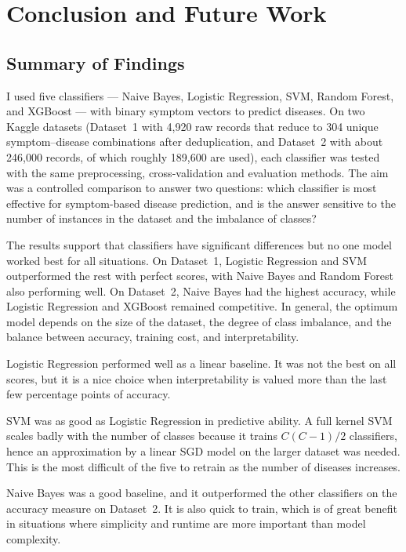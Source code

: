 \chapter{Conclusion and Future Work}
\label{ch:conclusion}

\section{Summary of Findings}
\label{sec:summary}

I used five classifiers --- Naive Bayes, Logistic Regression, SVM, Random Forest, and XGBoost --- with binary symptom vectors to predict diseases. On two Kaggle datasets (Dataset~1 with 4,920 raw records that reduce to 304 unique symptom--disease combinations after deduplication, and Dataset~2 with about 246,000 records, of which roughly 189,600 are used), each classifier was tested with the same preprocessing, cross-validation and evaluation methods. The aim was a controlled comparison to answer two questions: which classifier is most effective for symptom-based disease prediction, and is the answer sensitive to the number of instances in the dataset and the imbalance of classes?

The results support that classifiers have significant differences but no one model worked best for all situations. On Dataset~1, Logistic Regression and SVM outperformed the rest with perfect scores, with Naive Bayes and Random Forest also performing well. On Dataset~2, Naive Bayes had the highest accuracy, while Logistic Regression and XGBoost remained competitive. In general, the optimum model depends on the size of the dataset, the degree of class imbalance, and the balance between accuracy, training cost, and interpretability.

Logistic Regression performed well as a linear baseline. It was not the best on all scores, but it is a nice choice when interpretability is valued more than the last few percentage points of accuracy.

SVM was as good as Logistic Regression in predictive ability. A full kernel SVM scales badly with the number of classes because it trains $C(C-1)/2$ classifiers, hence an approximation by a linear SGD model on the larger dataset was needed. This is the most difficult of the five to retrain as the number of diseases increases.

Naive Bayes was a good baseline, and it outperformed the other classifiers on the accuracy measure on Dataset~2. It is also quick to train, which is of great benefit in situations where simplicity and runtime are more important than model complexity.

